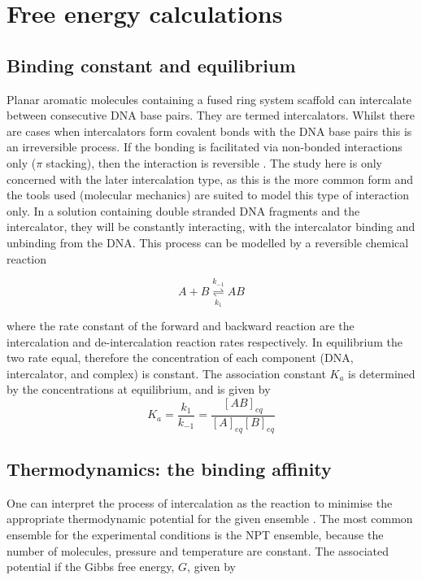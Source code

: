 \documentclass[11pt, a4paper]{report}
\begin{document}




\section{Free energy calculations}

\subsection{Binding constant and equilibrium}

Planar aromatic molecules containing a fused ring system scaffold can intercalate between consecutive DNA base pairs. They are termed intercalators. Whilst there are cases when intercalators form covalent bonds with the DNA base pairs this is an irreversible process. If the bonding is facilitated via non-bonded interactions only ($\pi$ stacking), then the interaction is reversible \cite{berg2002biochemistry}. The study here is only concerned with the later intercalation type, as this is the more common form and the tools used (molecular mechanics) are suited to model this type of interaction only. In a solution containing double stranded DNA fragments and the intercalator, they will be constantly interacting, with the intercalator binding and unbinding from the DNA. This process can be modelled by a reversible chemical reaction

\begin{equation}
  A + B \underset{k_1}{\stackrel{k_{-1}}{\rightleftharpoons}} AB
\end{equation}

where the rate constant of the forward and backward reaction are the intercalation and de-intercalation reaction rates respectively. In equilibrium the two rate equal, therefore the concentration of each component (DNA, intercalator, and complex) is constant. The association constant $K_a$ is determined by the concentrations at equilibrium, and is given by
\begin{equation}
  K_a = \frac{k_1}{k_{-1}} = \frac{[AB]_{eq}}{[A]_{eq} [B]_{eq}}
\end{equation}

\subsection{Thermodynamics: the binding affinity}

One can interpret the process of intercalation as the reaction to minimise the appropriate thermodynamic potential for the given ensemble \cite{adkins1983equilibrium}. The most common ensemble for the experimental conditions is the NPT ensemble, because the number of molecules, pressure and temperature are constant. The associated potential if the Gibbs free energy, $G$, given by
\end{document}
